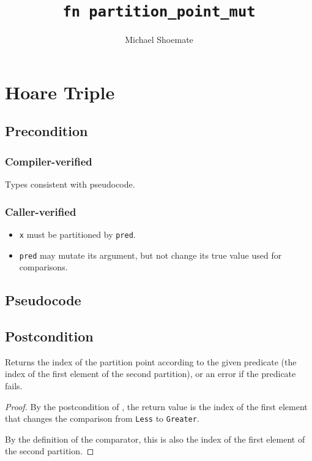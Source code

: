 \documentclass{article}
\title{\texttt{fn partition\_point\_mut}}
\author{Michael Shoemate}
\begin{document}
\maketitle

\section{Hoare Triple}
\subsection*{Precondition}
\subsubsection*{Compiler-verified}
Types consistent with pseudocode.

\subsubsection*{Caller-verified}
\begin{itemize}
    \item \texttt{x} must be partitioned by \texttt{pred}.
    \item \texttt{pred} may mutate its argument, but not change its true value used for comparisons.
\end{itemize}

\subsection*{Pseudocode}
\label{sec:python-pseudocode}


\subsection*{Postcondition}

\begin{theorem}
    Returns the index of the partition point according to the given predicate (the index of the first element of the second partition),
    or an error if the predicate fails.
\end{theorem}

\begin{proof}
    By the postcondition of ,
    the return value is the index of the first element that changes the comparison from \texttt{Less} to \texttt{Greater}.

    By the definition of the comparator, this is also the index of the first element of the second partition.
\end{proof}
\end{document}
